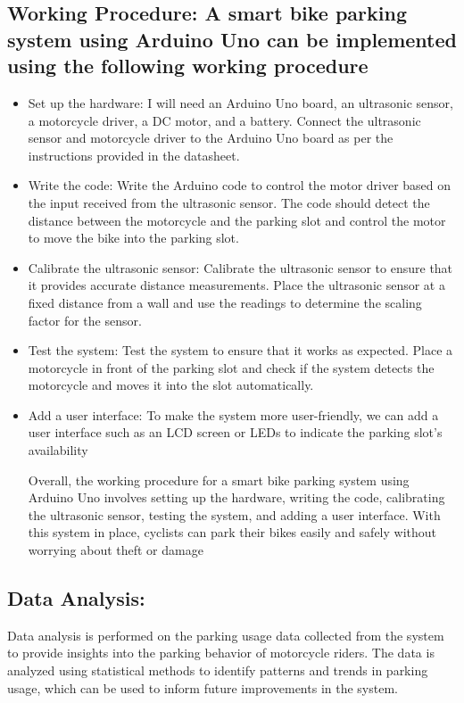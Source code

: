 \documentclass[conference]{IEEEtran}
\begin{document}
	\subsection {Working Procedure: A smart bike parking system using Arduino Uno can be implemented using the following working procedure}
	\begin{itemize}
		\item Set up the hardware: I will need an Arduino Uno board, an ultrasonic sensor, a motorcycle driver, a DC motor, and a battery. Connect the ultrasonic sensor and motorcycle driver to the Arduino Uno board as per the instructions provided in the datasheet.
		\item Write the code: Write the Arduino code to control the motor driver based on the input received from the ultrasonic sensor. The code should detect the distance between the motorcycle and the parking slot and control the motor to move the bike into the parking slot.
		\item Calibrate the ultrasonic sensor: Calibrate the ultrasonic sensor to ensure that it provides accurate distance measurements. Place the ultrasonic sensor at a fixed distance from a wall and use the readings to determine the scaling factor for the sensor.
		\item Test the system: Test the system to ensure that it works as expected. Place a motorcycle in front of the parking slot and check if the system detects the motorcycle and moves it into the slot automatically.
		\item  Add a user interface: To make the system more user-friendly, we can add a user interface such as an LCD screen or LEDs to indicate the parking slot's availability
		
		
		Overall, the working procedure for a smart bike parking system using Arduino Uno involves setting up the hardware, writing the code, calibrating the ultrasonic sensor, testing the system, and adding a user interface. With this system in place, cyclists can park their bikes easily and safely without worrying about theft or damage
	\end{itemize}	
		
	
	\subsection{Data Analysis:}
Data analysis is performed on the parking usage data collected from the system to provide insights into the parking behavior of motorcycle riders. The data is analyzed using statistical methods to identify patterns and trends in parking usage, which can be used to inform future improvements in the system.
\end{document}
